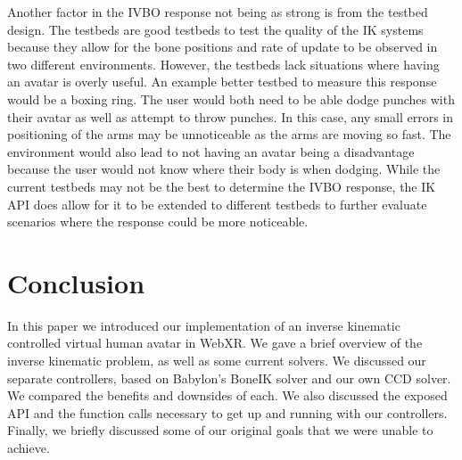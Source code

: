 \documentclass{vgtc}                          %
\begin{document}
    Another factor in the IVBO response not being as strong is from the testbed design. The testbeds are good testbeds to test the quality of the IK systems because they allow for the bone positions and rate of update to be observed in two different environments. However, the testbeds lack situations where having an avatar is overly useful. An example better testbed to measure this response would be a boxing ring. The user would both need to be able dodge punches with their avatar as well as attempt to throw punches. In this case, any small errors in positioning of the arms may be unnoticeable as the arms are moving so fast. The environment would also lead to not having an avatar being a disadvantage because the user would not know where their body is when dodging. While the current testbeds may not be the best to determine the IVBO response, the IK API does allow for it to be extended to different testbeds to further evaluate scenarios where the response could be more noticeable.


\section{Conclusion}

   In this paper we introduced our implementation of an inverse kinematic controlled virtual human avatar in WebXR. We gave a brief overview of the inverse kinematic problem, as well as some current solvers. We discussed our separate controllers, based on Babylon's BoneIK solver and our own CCD solver. We compared the benefits and downsides of each. We also discussed the exposed API and the function calls necessary to get up and running with our controllers. Finally, we briefly discussed some of our original goals that we were unable to achieve.



%
%
%
%
%


\end{document}
